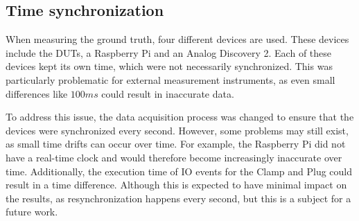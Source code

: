 \subsection{Time synchronization}

When measuring the ground truth, four different devices are used. These devices include the DUTs, a Raspberry Pi and an Analog Discovery 2. Each of these devices kept its own time, which were not necessarily synchronized. This was particularly problematic for external measurement instruments, as even small differences like $100ms$ could result in inaccurate data.

To address this issue, the data acquisition process was changed to ensure that the devices were synchronized every second. However, some problems may still exist, as small time drifts can occur over time. For example, the Raspberry Pi did not have a real-time clock\cite{RTCRasp} and would therefore become increasingly inaccurate over time. Additionally, the execution time of IO events for the Clamp and Plug could result in a time difference. Although this is expected to have minimal impact on the results, as resynchronization happens every second, but this is a subject for a future work.


